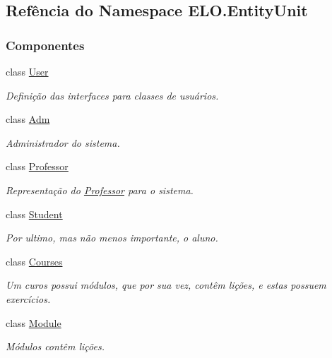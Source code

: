 \hypertarget{namespaceELO_1_1EntityUnit}{\subsection{Refência do Namespace E\-L\-O.\-Entity\-Unit}
\label{namespaceELO_1_1EntityUnit}
}
\subsubsection*{Componentes}
\begin{DoxyCompactItemize}
\item 
class \hyperlink{classELO_1_1EntityUnit_1_1User}{User}
\begin{DoxyCompactList}\small\item\em Definição das interfaces para classes de usuários. \end{DoxyCompactList}\item 
class \hyperlink{classELO_1_1EntityUnit_1_1Adm}{Adm}
\begin{DoxyCompactList}\small\item\em Administrador do sistema. \end{DoxyCompactList}\item 
class \hyperlink{classELO_1_1EntityUnit_1_1Professor}{Professor}
\begin{DoxyCompactList}\small\item\em Representação do \hyperlink{classELO_1_1EntityUnit_1_1Professor}{Professor} para o sistema. \end{DoxyCompactList}\item 
class \hyperlink{classELO_1_1EntityUnit_1_1Student}{Student}
\begin{DoxyCompactList}\small\item\em Por ultimo, mas não menos importante, o aluno. \end{DoxyCompactList}\item 
class \hyperlink{classELO_1_1EntityUnit_1_1Courses}{Courses}
\begin{DoxyCompactList}\small\item\em Um curos possui módulos, que por sua vez, contêm lições, e estas possuem exercícios. \end{DoxyCompactList}\item 
class \hyperlink{classELO_1_1EntityUnit_1_1Module}{Module}
\begin{DoxyCompactList}\small\item\em Módulos contêm lições. \end{DoxyCompactList}\item 

\end{DoxyCompactItemize}
